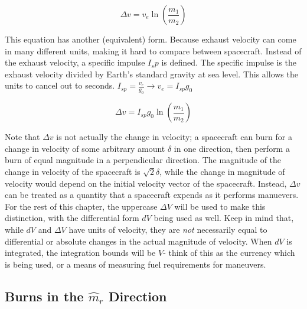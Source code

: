 \documentclass{article}
\begin{document}
\begin{equation}\label{Rocket Equation Ve}
    \Delta{}v=v_e\ln\left(\frac{m_1}{m_2}\right)
\end{equation}

This equation has another (equivalent) form. Because exhaust velocity can come in many different units, making it hard to compare between spacecraft. Instead of the exhaust velocity, a specific impulse $I_sp$ is defined. The specific impulse is the exhaust velocity divided by Earth's standard gravity at sea level. This allows the units to cancel out to seconds. $I_{sp}=\frac{v_e}{g_0}\rightarrow{}v_e=I_{sp}g_0$

\begin{equation}\label{Rocket Equation ISP}
    \Delta{}v=I_{sp}g_0\ln\left(\frac{m_1}{m_2}\right)
\end{equation}

Note that $\Delta v$ is not actually the change in velocity; a spacecraft can burn for a change in velocity of some arbitrary amount $\delta$ in one direction, then perform a burn of equal magnitude in a perpendicular direction. The magnitude of the change in velocity of the spacecraft is $\sqrt{2}\delta$, while the change in magnitude of velocity would depend on the initial velocity vector of the spacecraft. Instead, $\Delta v$ can be treated as a quantity that a spacecraft expends as it performs manuevers. For the rest of this chapter, the uppercase $\Delta V$ will be used to make this distinction, with the differential form $dV$ being used as well. Keep in mind that, while $dV$ and $\Delta V$ have units of velocity, they are \textit{not} necessarily equal to differential or absolute changes in the actual magnitude of velocity. When $dV$ is integrated, the integration bounds will be $V$- think of this as the currency which is being used, or a means of measuring fuel requirements for maneuvers.

\bigskip\bigskip
\subsection{Burns in the \texorpdfstring{$\hat{m}_r$}{Radial} Direction}\label{sec:Mr manuevers}
\end{document}
